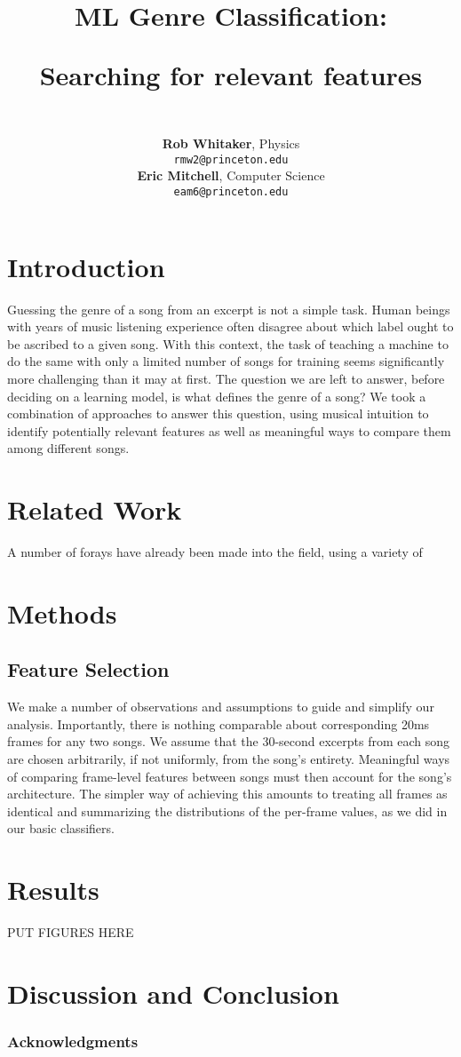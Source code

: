 \documentclass{article} %
\title{ML Genre Classification: \\
\begin{large} Searching for relevant features \end{large} }
\author{\\
\textbf{Rob Whitaker}, 
Physics \\
\texttt{rmw2@princeton.edu} \\
\textbf{Eric Mitchell}, 
Computer Science \\
\texttt{eam6@princeton.edu} \\
}
\begin{document}
\maketitle

\begin{abstract}

\end{abstract}

\section{Introduction}
Guessing the genre of a song from an excerpt is not a simple task.  Human beings with years of music listening experience often disagree about which label ought to be ascribed to a given song.  With this context, the task of teaching a machine to do the same with only a limited number of songs for training seems significantly more challenging than it may at first.  The question we are left to answer, before deciding on a learning model, is what defines the genre of a song?  We took a combination of approaches to answer this question, using musical intuition to identify potentially relevant features as well as meaningful ways to compare them among different songs.  

\section{Related Work}
A number of forays have already been made into the field, using a variety of 

\section{Methods}
\subsection{Feature Selection}

We make a number of observations and assumptions to guide and simplify our analysis.  Importantly, there is nothing comparable about corresponding 20ms frames for any two songs.  We assume that the 30-second excerpts from each song are chosen arbitrarily, if not uniformly, from the song's entirety.  Meaningful ways of comparing frame-level features between songs must then account for the song's architecture.  The simpler way of achieving this amounts to treating all frames as identical and summarizing the distributions of the per-frame values, as we did in our basic classifiers.

\section{Results}
PUT FIGURES HERE

\section{Discussion and Conclusion}

\subsubsection*{Acknowledgments}



\end{document}
